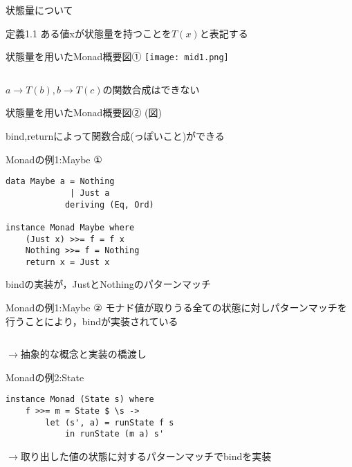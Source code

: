 \documentclass[uplatex,dvipdfmx,ja=standard]{beamer}
\begin{document}
\begin{frame}{状態量について}
    \begin{block}{定義1.1}
    ある値xが状態量を持つことを$T(x)$と表記する
    \end{block}
\end{frame}

\begin{frame}[fragile]{状態量を用いたMonad概要図①}
    \centering 
    \texttt{[image: mid1.png]}
    \begin{verbatim}
    \end{verbatim}

    $a \to T(b) , b \to T(c)$の関数合成はできない
\end{frame}

\begin{frame}{状態量を用いたMonad概要図②}
    (図)

    bind,returnによって関数合成(っぽいこと)ができる
\end{frame}

\begin{frame}[fragile]{Monadの例1:Maybe ①}
    \begin{verbatim}
data Maybe a = Nothing
             | Just a 
            deriving (Eq, Ord)
    
instance Monad Maybe where
    (Just x) >>= f = f x
    Nothing >>= f = Nothing
    return x = Just x
    \end{verbatim}
    bindの実装が，JustとNothingのパターンマッチ
\end{frame}

\begin{frame}[fragile]{Monadの例1:Maybe ②}
    モナド値が取りうる全ての状態に対しパターンマッチを行うことにより，bindが実装されている
    \begin{verbatim}

    \end{verbatim}
    $\to$抽象的な概念と実装の橋渡し
\end{frame}

\begin{frame}[fragile]{Monadの例2:State}
    \begin{verbatim}
instance Monad (State s) where
    f >>= m = State $ \s ->
        let (s', a) = runState f s
            in runState (m a) s'

    \end{verbatim}
    $\to$取り出した値の状態に対するパターンマッチでbindを実装
\end{frame}
\end{document}
